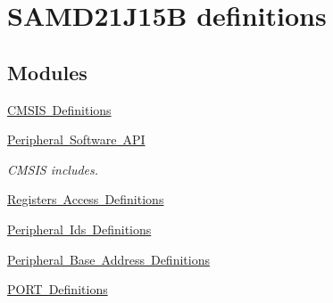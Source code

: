 \hypertarget{group___s_a_m_d21_j15_b__definitions}{}\section{S\+A\+M\+D21\+J15B definitions}
\label{group___s_a_m_d21_j15_b__definitions}
\subsection*{Modules}
\begin{DoxyCompactItemize}
\item 
\mbox{\hyperlink{group___s_a_m_d21_j15_b__cmsis}{C\+M\+S\+I\+S Definitions}}
\item 
\mbox{\hyperlink{group___s_a_m_d21_j15_b__api}{Peripheral Software A\+PI}}
\begin{DoxyCompactList}\small\item\em C\+M\+S\+IS includes. \end{DoxyCompactList}\item 
\mbox{\hyperlink{group___s_a_m_d21_j15_b__reg}{Registers Access Definitions}}
\item 
\mbox{\hyperlink{group___s_a_m_d21_j15_b__id}{Peripheral Ids Definitions}}
\item 
\mbox{\hyperlink{group___s_a_m_d21_j15_b__base}{Peripheral Base Address Definitions}}
\item 
\mbox{\hyperlink{group___s_a_m_d21_j15_b__port}{P\+O\+R\+T Definitions}}
\end{DoxyCompactItemize}
